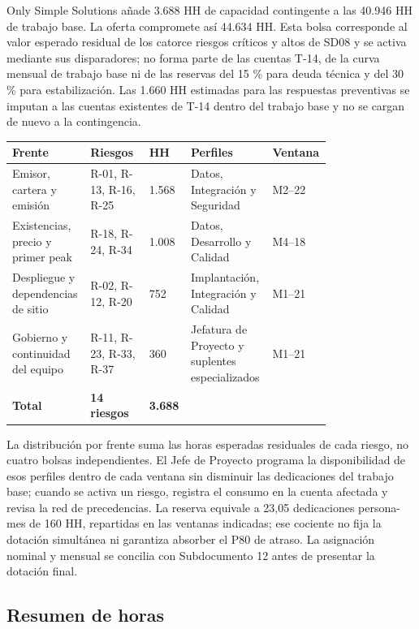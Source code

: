 Only Simple Solutions añade 3.688 HH de capacidad contingente a las 40.946 HH de trabajo base. La oferta compromete así 44.634 HH. Esta bolsa corresponde al valor esperado residual de los catorce riesgos críticos y altos de SD08 y se activa mediante sus disparadores; no forma parte de las cuentas T-14, de la curva mensual de trabajo base ni de las reservas del 15 \% para deuda técnica y del 30 \% para estabilización. Las 1.660 HH estimadas para las respuestas preventivas se imputan a las cuentas existentes de T-14 dentro del trabajo base y no se cargan de nuevo a la contingencia.

\begin{longtable}{p{0.19\linewidth}p{0.18\linewidth}p{0.08\linewidth}p{0.22\linewidth}p{0.11\linewidth}}
\toprule
\textbf{Frente} & \textbf{Riesgos} & \textbf{HH} & \textbf{Perfiles} & \textbf{Ventana} \\
\midrule
\endhead
\bottomrule
\endlastfoot
Emisor, cartera y emisión & R-01, R-13, R-16, R-25 & 1.568 & Datos, Integración y Seguridad & M2--22 \\
Existencias, precio y primer peak & R-18, R-24, R-34 & 1.008 & Datos, Desarrollo y Calidad & M4--18 \\
Despliegue y dependencias de sitio & R-02, R-12, R-20 & 752 & Implantación, Integración y Calidad & M1--21 \\
Gobierno y continuidad del equipo & R-11, R-23, R-33, R-37 & 360 & Jefatura de Proyecto y suplentes especializados & M1--21 \\
\textbf{Total} & \textbf{14 riesgos} & \textbf{3.688} & & \\
\end{longtable}

La distribución por frente suma las horas esperadas residuales de cada riesgo, no cuatro bolsas independientes. El Jefe de Proyecto programa la disponibilidad de esos perfiles dentro de cada ventana sin disminuir las dedicaciones del trabajo base; cuando se activa un riesgo, registra el consumo en la cuenta afectada y revisa la red de precedencias. La reserva equivale a 23,05 dedicaciones persona-mes de 160 HH, repartidas en las ventanas indicadas; ese cociente no fija la dotación simultánea ni garantiza absorber el P80 de atraso. La asignación nominal y mensual se concilia con Subdocumento 12 antes de presentar la dotación final.

\subsection{Resumen de horas}

